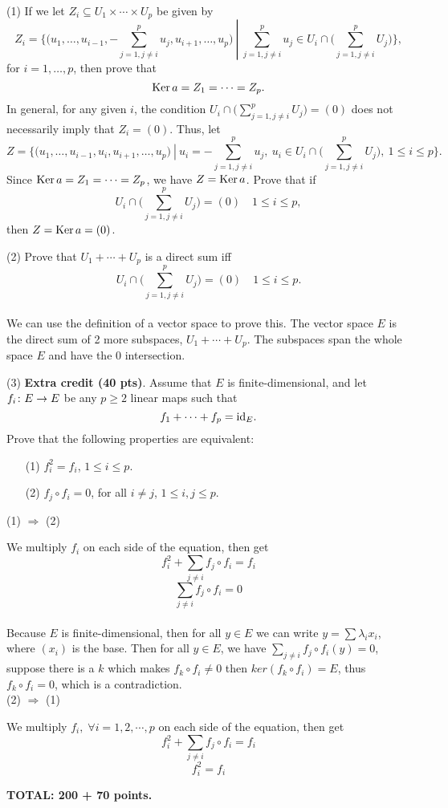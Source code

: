 \documentclass[12pt]{article}
\begin{document}
\medskip
(1)
If we let $Z_i \subseteq U_1\times \cdots \times U_p$ be given by
\[
Z_i = \left.\bigg\{\Big(u_1, \ldots, u_{i - 1}, -\sum_{j = 1, j \not= i}^p u_j, u_{i + 1}, 
\ldots, u_p\Big) \>\right|\> \sum_{j = 1, j \not= i}^p u_j  \in  
U_i \cap \bigg(\sum_{j = 1, j \not= i}^p U_j \bigg) 
\bigg\},
\]
for $i = 1, \ldots, p$, then prove that
\[
{\rm Ker}\,{a} = Z_1 = \cdots =   Z_p.
\]
In general, for any given $i$, the condition
$U_i \cap \bigg(\sum_{j = 1, j \not= i}^p U_j \bigg) =
(0)$ does not necessarily imply that $Z_i = (0)$.
Thus, let 
\[
Z = \left.\bigg\{\Big(u_1, \ldots, u_{i - 1}, u_i, u_{i + 1}, 
\ldots, u_p\Big) \>\right|\> u_i =  -\sum_{j = 1, j \not= i}^p u_j, \>
u_i   \in  
U_i \cap \bigg(\sum_{j = 1, j \not= i}^p U_j \bigg), \> 1\leq i \leq p 
\bigg\}.
\]
Since ${\rm Ker}\,{a} = Z_1 = \cdots =  Z_p$, we have $Z = {\rm Ker}\, a$.
Prove that if
\[
U_i \cap \bigg(\sum_{j = 1, j \not= i}^p U_j \bigg) = (0)
\quad 1 \leq i \leq p,
\]
then $Z = {\rm Ker}\, a = (0)$.

\medskip
(2)
Prove that $U_1 + \cdots + U_p$ is a direct sum iff
\[
U_i \cap \bigg(\sum_{j = 1, j \not= i}^p U_j \bigg) = (0)
\quad 1 \leq i \leq p.
\] \\

We can use the definition of a vector space to prove this. The vector space $E$ is the direct sum of 2 more subspaces, $U_1 + \cdots + U_p$. The subspaces span the whole space $E$ and have the ${0}$ intersection.  

\medskip\noindent
(3)
{\bf Extra credit (40 pts)\/}.
Assume that $E$ is finite-dimensional, and
let $f_i\colon E\rightarrow E$ be any 
$p\geq 2$ linear maps such that
\[
f_1 + \cdots + f_p  = {\rm id}_E.
\]
Prove that the following properties are equivalent:
\begin{enumerate}
\item[(1)]
$f_i^2 = f_i$, $1\leq i \leq p$.
\item[(2)]
$f_j \circ f_i =  0$, for all $i \not= j$, $1\leq i, j \leq p$.
\end{enumerate}

(1) $\Rightarrow$ (2) 

We multiply $f_i$ on each side of the equation, then get 
\[
f_i^2 + \sum_{j \neq i} f_j \circ f_i = f_i
\]
\[
 \sum_{j \neq i} f_j \circ f_i  = 0
\] \\

Because $E$ is finite-dimensional, then for all $y \in E$ we can write $y = \sum \lambda_i x_i$, where $(x_i)$ is the base. Then for all $y \in E$, we have $ \sum_{j \neq i} f_j \circ f_i (y) = 0$, suppose there is a $k$ which makes $ f_k \circ f_i \neq 0 $ then $ker( f_k \circ f_i ) = E$, thus $ f_k \circ f_i  = 0$, which is a contradiction. \\

(2) $\Rightarrow$ (1)

We multiply $f_i, \; \forall i = 1,2,\cdots, p$ on each side of the equation, then get 
\[
f_i^2 + \sum_{j \neq i} f_j \circ f_i = f_i
\]
\[
 f_i^2 = f_i
\]


\vspace{0.5cm}\noindent
{\bf TOTAL: 200  + 70 points.}
\end{document}
